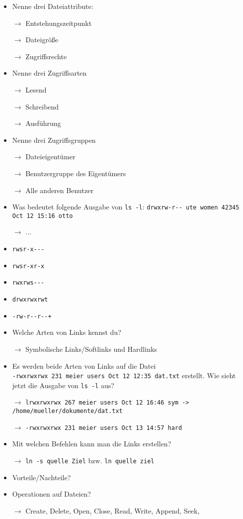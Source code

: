 \documentclass[10pt,a4paper]{article}
\begin{document}
\begin{itemize}
\item Nenne drei Dateiattribute:
\item[$\rightarrow$] Entstehungszeitpunkt
\item[$\rightarrow$] Dateigröße
\item[$\rightarrow$] Zugriffsrechte
\item Nenne drei Zugriffsarten
\item[$\rightarrow$] Lesend
\item[$\rightarrow$] Schreibend
\item[$\rightarrow$] Ausführung
\item Nenne drei Zugriffsgruppen
\item[$\rightarrow$] Dateieigentümer
\item[$\rightarrow$] Benutzergruppe des Eigentümers
\item[$\rightarrow$] Alle anderen Benutzer
\item Was bedeutet folgende Ausgabe von \verb_ls -l_: \verb_drwxrw-r-- ute women 42345 Oct 12 15:16 otto_
\item[$\rightarrow$] ...
\item \verb_rwsr-x---_
\item \verb_rwsr-xr-x_
\item \verb_rwxrws---_
\item \verb_drwxrwxrwt_
\item \verb_-rw-r--r--+_
\item Welche Arten von Links kennst du?
\item[$\rightarrow$] Symbolische Links/Softlinks und Hardlinks
\item Es werden beide Arten von Links auf die Datei\\ \verb_-rwxrwxrwx 231 meier users Oct 12 12:35 dat.txt_ erstellt. Wie sieht jetzt die Ausgabe von \verb_ls -l_ aus?
\item[$\rightarrow$] \verb_lrwxrwxrwx 267 meier users Oct 12 16:46 sym -> /home/mueller/dokumente/dat.txt_
\item[$\rightarrow$] \verb_-rwxrwxrwx 231 meier users Oct 13 14:57 hard_
\item Mit welchen Befehlen kann man die Links erstellen?
\item[$\rightarrow$] \verb_ln -s quelle Ziel_ bzw. \verb_ln quelle ziel_
\item Vorteile/Nachteile?
\item Operationen auf Dateien?
\item[$\rightarrow$] Create, Delete, Open, Close, Read, Write, Append, Seek,

\end{itemize}
\end{document}
